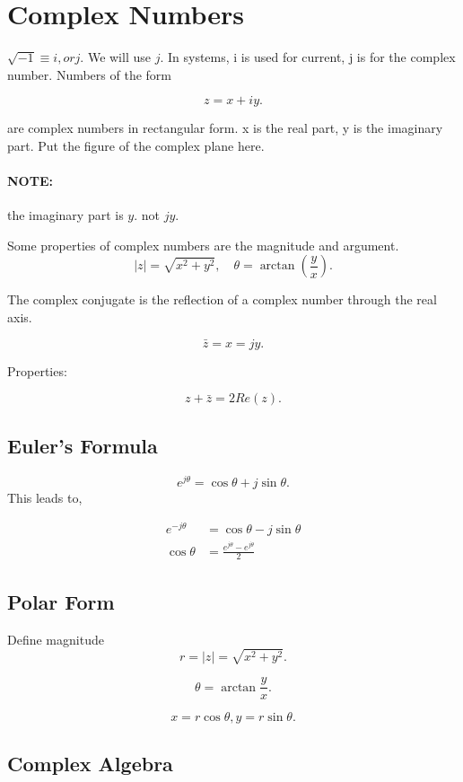 \documentclass[12pt, a4paper]{report}
\begin{document}
  \section{Complex Numbers}
  $ \sqrt{-1} \equiv i, or j. $ We will use $ j. $ In systems, i is used for current, j is for the complex number. Numbers of the form

  \[
      z = x + iy
    .\]

  are complex numbers in rectangular form. x is the real part, y is the imaginary part. Put the figure of the complex plane here.

  \paragraph{NOTE:} the imaginary part is $ y. $ not $ jy. $

  Some properties of complex numbers are the magnitude and argument.
  \[
      |z| = \sqrt{x ^2 + y ^2}, \quad \theta = \arctan{ \left( \frac{y}{x} \right)}
    .\]

  The complex conjugate is the reflection of a complex number through the real axis.

  \[
      \bar{z} = x = jy
    .\]

  Properties:

  \[
      z + \bar{z} = 2 Re(z)
    .\]

  \subsection{Euler's Formula}

  \[
      e^{j\theta} = \cos{\theta} + j\sin{\theta}
    .\]
  This leads to,

  \begin{align}
    e^{-j\theta} &= \cos{\theta} - j\sin{\theta} \\
    \cos{\theta} &= \frac{e^{j\theta} - e^{j\theta}}{2}
  \end{align}

  \subsection{Polar Form}

  Define magnitude
  \[
      r = |z| = \sqrt{x ^2 + y ^2}
    .\]

  \[
      \theta = \arctan{\frac{y}{x}}
    .\]

    \[
        x = r\cos{\theta}, y = r\sin{\theta}
      .\]

  \subsection{Complex Algebra}
\end{document}

